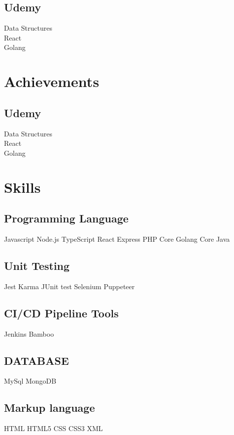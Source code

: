 \documentclass[]{deedy-resume-openfont}
\begin{document}
\begin{minipage}[t]{0.33\textwidth}
\subsection{Udemy}
Data Structures \\
React \\
Golang \\
\sectionsep



\section{Achievements}
\subsection{Udemy}
Data Structures \\
React \\
Golang \\
\sectionsep


\section{Skills}
\subsection{Programming Language}
Javascript \textbullet{} Node.js \textbullet{} TypeScript \textbullet{} React \textbullet{} Express \textbullet{} PHP \textbullet{} Core Golang \textbullet{} Core Java
\sectionsep
\subsection{Unit Testing}
Jest \textbullet{}   Karma \textbullet{} JUnit test \textbullet{} Selenium \textbullet{} Puppeteer
\sectionsep
\subsection{CI/CD Pipeline Tools}
Jenkins \textbullet{}   Bamboo
\sectionsep
\subsection{DATABASE}
MySql \textbullet{} MongoDB
\sectionsep
\subsection{Markup language}
HTML \textbullet{} HTML5 \textbullet{} CSS \textbullet{} CSS3 \textbullet{} XML
\sectionsep

\end{minipage}
\end{document}

